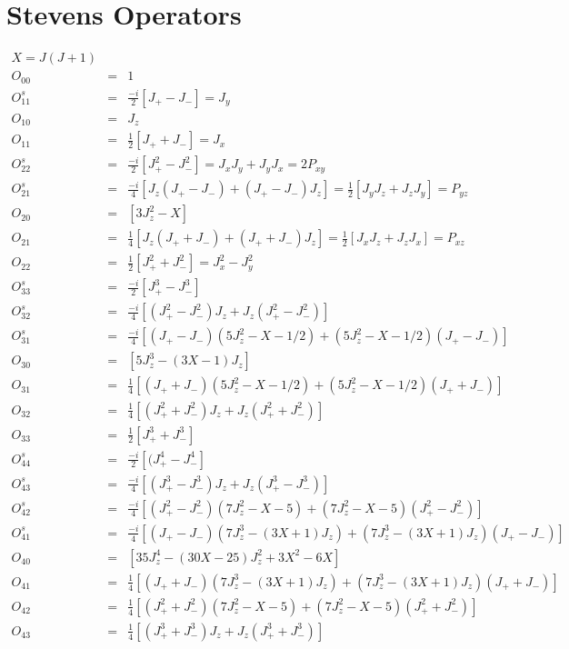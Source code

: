 \section{Stevens Operators}\label{stevens}

\begin{eqnarray*}
X=J(J+1)\\
O_{00}&=&1\\
\hline
O^s_{11}&=&\frac{-i}{2}[J_+-J_-]=J_y \\
O_{10}&=&J_z \\
O_{11}&=&\frac{1}{2}[J_++J_-]=J_x \\
\hline
O^s_{22}&=&\frac{-i}{2}[J_+^2-J_-^2]=J_xJ_y+J_yJ_x=2P_{xy} \\
O^s_{21}&=&\frac{-i}{4}[J_z(J_+-J_-)+(J_+-J_-)J_z]=\frac{1}{2}[J_yJ_z+J_zJ_y]=P_{yz} \\
O_{20}&=&[3J_z^2-X] \\
O_{21}&=&\frac{1}{4}[J_z(J_++J_-)+(J_++J_-)J_z]=\frac{1}{2}[J_xJ_z+J_zJ_x]=P_{xz} \\
O_{22}&=&\frac{1}{2}[J_+^2+J_-^2]=J_x^2-J_y^2 \\
\hline
O^s_{33}&=&\frac{-i}{2}[J_+^3-J_-^3] \\
O^s_{32}&=&\frac{-i}{4}[(J_+^2-J_-^2)J_z+J_z(J_+^2-J_-^2)] \\
O^s_{31}&=&\frac{-i}{4}[(J_+-J_-)(5J_z^2-X-1/2)+(5J_z^2-X-1/2)(J_+-J_-)] \\
O_{30}&=&[5J_z^3-(3X-1)J_z] \\
O_{31}&=&\frac{1}{4}[(J_++J_-)(5J_z^2-X-1/2)+(5J_z^2-X-1/2)(J_++J_-)] \\
O_{32}&=&\frac{1}{4}[(J_+^2+J_-^2)J_z+J_z(J_+^2+J_-^2)] \\
O_{33}&=&\frac{1}{2}[J_+^3+J_-^3] \\
\hline
O^s_{44}&=&\frac{-i}{2}[(J_+^4-J_-^4]\\
O^s_{43}&=&\frac{-i}{4}[(J_+^3-J_-^3)J_z+J_z(J_+^3-J_-^3)] \\
O^s_{42}&=&\frac{-i}{4}[(J_+^2-J_-^2)(7J_z^2-X-5)+(7J_z^2-X-5)(J_+^2-J_-^2)] \\
O^s_{41}&=&\frac{-i}{4}[(J_+-J_-)(7J_z^3-(3X+1)J_z)+(7J_z^3-(3X+1)J_z)(J_+-J_-)] \\
O_{40}&=&[35J_z^4-(30X-25)J_z^2+3X^2-6X] \\
O_{41}&=&\frac{1}{4}[(J_++J_-)(7J_z^3-(3X+1)J_z)+(7J_z^3-(3X+1)J_z)(J_++J_-)] \\
O_{42}&=&\frac{1}{4}[(J_+^2+J_-^2)(7J_z^2-X-5)+(7J_z^2-X-5)(J_+^2+J_-^2)] \\
O_{43}&=&\frac{1}{4}[(J_+^3+J_-^3)J_z+J_z(J_+^3+J_-^3)] \\

\end{eqnarray*}
